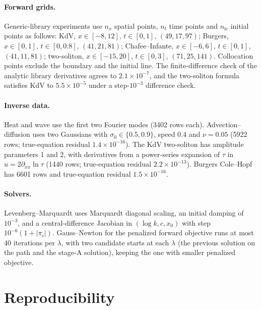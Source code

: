 \documentclass{article}
\begin{document}
\paragraph{Forward grids.} Generic-library experiments use $n_x$ spatial points, $n_t$ time points and $n_{\mathrm{ic}}$ initial points as follows: KdV, $x\in[-8,12]$, $t\in[0,1]$, $(49, 17, 97)$; Burgers, $x\in[0,1]$, $t\in[0,0.8]$, $(41,21,81)$; Chafee--Infante, $x\in[-6,6]$, $t\in[0,1]$, $(41,11,81)$; two-soliton, $x\in[-15,20]$, $t\in[0,3]$, $(71,25,141)$. Collocation points exclude the boundary and the initial line. The finite-difference check of the analytic library derivatives agrees to $2.1\times10^{-7}$, and the two-soliton formula satisfies KdV to $5.5\times10^{-5}$ under a step-$10^{-3}$ difference check.

\paragraph{Inverse data.} Heat and wave use the first two Fourier modes (3402 rows each). Advection--diffusion uses two Gaussians with $\sigma_0 \in \{0.5, 0.9\}$, speed 0.4 and $\nu=0.05$ (5922 rows; true-equation residual $1.4\times10^{-16}$). The KdV two-soliton has amplitude parameters 1 and 2, with derivatives from a power-series expansion of $\tau$ in $u = 2\partial_{xx}\ln\tau$ (1440 rows; true-equation residual $2.2\times10^{-13}$). Burgers Cole--Hopf has 6601 rows and true-equation residual $1.5\times10^{-16}$.

\paragraph{Solvers.} Levenberg--Marquardt uses Marquardt diagonal scaling, an initial damping of $10^{-3}$, and a central-difference Jacobian in $(\log k, c, x_0)$ with step $10^{-6}(1+|\pi_i|)$. Gauss--Newton for the penalized forward objective runs at most 40 iterations per $\lambda$, with two candidate starts at each $\lambda$ (the previous solution on the path and the stage-A solution), keeping the one with smaller penalized objective.

\section{Reproducibility}
\label{app:repro}
\end{document}

